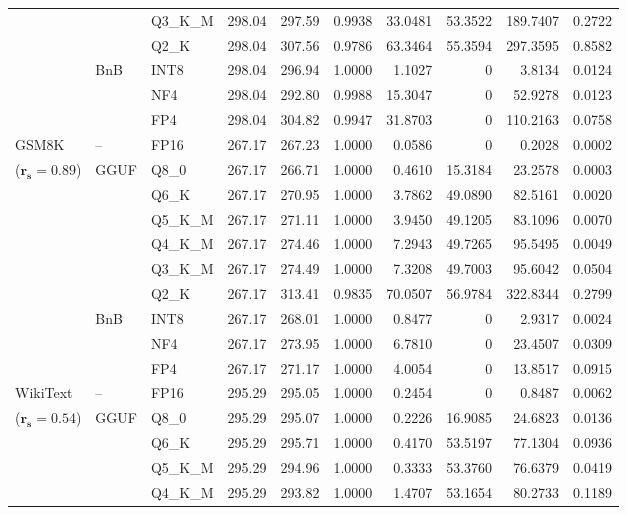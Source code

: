 \begin{table}[t]
{\begin{tabular}{ll l rrrrrrr}
 &  & Q3\_K\_M & 298.04 & 297.59 & 0.9938 & 33.0481 & 53.3522 & 189.7407 & 0.2722 \\
 &  & Q2\_K & 298.04 & 307.56 & 0.9786 & 63.3464 & 55.3594 & 297.3595 & 0.8582 \\
 & BnB & INT8 & 298.04 & 296.94 & 1.0000 & 1.1027 & \cellcolor{cyan!12} $0$ & 3.8134 & 0.0124 \\
 &  & NF4 & 298.04 & 292.80 & 0.9988 & 15.3047 & \cellcolor{cyan!12} $0$ & 52.9278 & 0.0123 \\
 &  & FP4 & 298.04 & 304.82 & 0.9947 & 31.8703 & \cellcolor{cyan!12} $0$ & 110.2163 & 0.0758 \\
\midrule
GSM8K & -- & FP16 & 267.17 & 267.23 & 1.0000 & 0.0586 & \cellcolor{cyan!12} $0$ & 0.2028 & 0.0002 \\
{\small ($\mathbf{r_s{=}0.89}$)} & GGUF & Q8\_0 & 267.17 & 266.71 & 1.0000 & 0.4610 & 15.3184 & 23.2578 & 0.0003 \\
 &  & Q6\_K & 267.17 & 270.95 & 1.0000 & 3.7862 & 49.0890 & 82.5161 & 0.0020 \\
 &  & Q5\_K\_M & 267.17 & 271.11 & 1.0000 & 3.9450 & 49.1205 & 83.1096 & 0.0070 \\
 &  & Q4\_K\_M & 267.17 & 274.46 & 1.0000 & 7.2943 & 49.7265 & 95.5495 & 0.0049 \\
 &  & Q3\_K\_M & 267.17 & 274.49 & 1.0000 & 7.3208 & 49.7003 & 95.6042 & 0.0504 \\
 &  & Q2\_K & 267.17 & 313.41 & 0.9835 & 70.0507 & 56.9784 & 322.8344 & 0.2799 \\
 & BnB & INT8 & 267.17 & 268.01 & 1.0000 & 0.8477 & \cellcolor{cyan!12} $0$ & 2.9317 & 0.0024 \\
 &  & NF4 & 267.17 & 273.95 & 1.0000 & 6.7810 & \cellcolor{cyan!12} $0$ & 23.4507 & 0.0309 \\
 &  & FP4 & 267.17 & 271.17 & 1.0000 & 4.0054 & \cellcolor{cyan!12} $0$ & 13.8517 & 0.0915 \\
\midrule
WikiText & -- & FP16 & 295.29 & 295.05 & 1.0000 & 0.2454 & \cellcolor{cyan!12} $0$ & 0.8487 & 0.0062 \\
{\small ($\mathbf{r_s{=}0.54}$)} & GGUF & Q8\_0 & 295.29 & 295.07 & 1.0000 & 0.2226 & 16.9085 & 24.6823 & 0.0136 \\
 &  & Q6\_K & 295.29 & 295.71 & 1.0000 & 0.4170 & 53.5197 & 77.1304 & 0.0936 \\
 &  & Q5\_K\_M & 295.29 & 294.96 & 1.0000 & 0.3333 & 53.3760 & 76.6379 & 0.0419 \\
 &  & Q4\_K\_M & 295.29 & 293.82 & 1.0000 & 1.4707 & 53.1654 & 80.2733 & 0.1189 \\

\end{tabular}}
\end{table}
